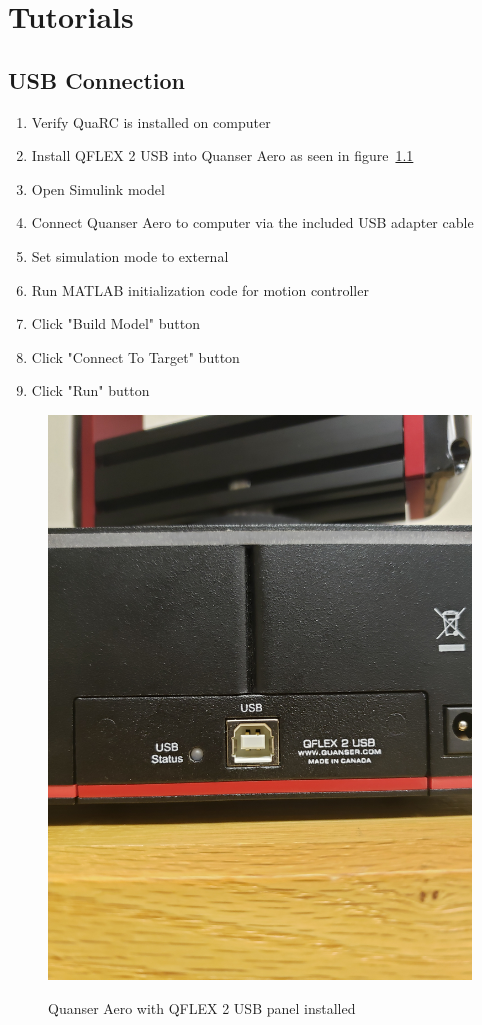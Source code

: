 \chapter{Tutorials}

\section{USB Connection}
\label{sec:USBtut}
\begin{enumerate}
    \item Verify QuaRC is installed on computer
    \item Install QFLEX 2 USB into Quanser Aero as seen in figure~\ref{fig:USB_Panel}
    \item Open Simulink model
    \item Connect Quanser Aero to computer via the included USB adapter cable
    \item Set simulation mode to external
    \item Run MATLAB initialization code for motion controller
    \item Click "Build Model" button
    \item Click "Connect To Target" button
    \item Click "Run" button
\end{enumerate}

\begin{figure}[!h]
    \centering
    \includegraphics[angle = 270,width=.248\textwidth,keepaspectratio=true]{figs/img/USB_Panel.jpg}
    \label{fig:USB_Panel}
    \caption{Quanser Aero with QFLEX 2 USB panel installed}
\end{figure}
